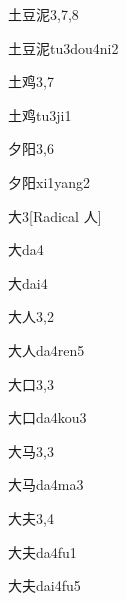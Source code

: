 \begin{entry}{土豆泥}{3,7,8}
  \begin{phonetics}{土豆泥}{tu3dou4ni2}
  \end{phonetics}
\end{entry}

\begin{entry}{土鸡}{3,7}
  \begin{phonetics}{土鸡}{tu3ji1}
  \end{phonetics}
\end{entry}

\begin{entry}{夕阳}{3,6}
  \begin{phonetics}{夕阳}{xi1yang2}
  \end{phonetics}
\end{entry}

\begin{entry}{大}{3}[Radical ⼈]
  \begin{phonetics}{大}{da4}
  \end{phonetics}
  \begin{phonetics}{大}{dai4}
  \end{phonetics}
\end{entry}

\begin{entry}{大人}{3,2}
  \begin{phonetics}{大人}{da4ren5}
  \end{phonetics}
\end{entry}

\begin{entry}{大口}{3,3}
  \begin{phonetics}{大口}{da4kou3}
  \end{phonetics}
\end{entry}

\begin{entry}{大马}{3,3}
  \begin{phonetics}{大马}{da4ma3}
  \end{phonetics}
\end{entry}

\begin{entry}{大夫}{3,4}
  \begin{phonetics}{大夫}{da4fu1}
  \end{phonetics}
  \begin{phonetics}{大夫}{dai4fu5}
  \end{phonetics}
\end{entry}

